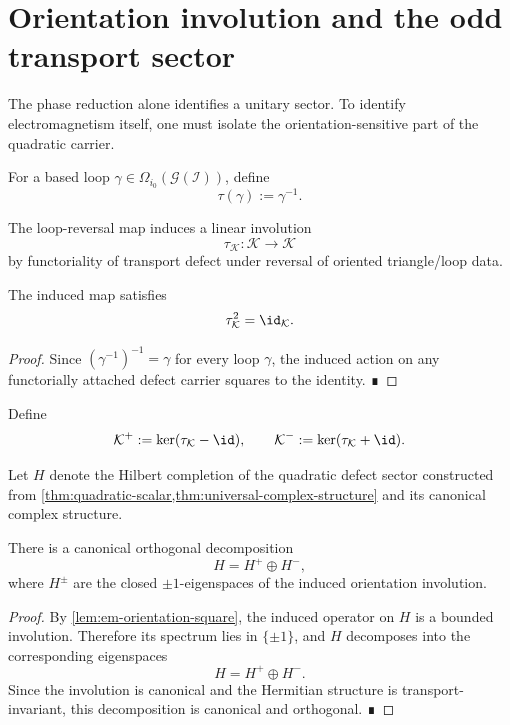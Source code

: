\section{Orientation involution and the odd transport sector}
\label{sec:em-orientation-odd}
The phase reduction alone identifies a unitary sector.
To identify electromagnetism itself, one must isolate the
orientation-sensitive part of the quadratic carrier.
\begin{definition}
	For a based loop \(\gamma\in\Omega_{i_0}(\mathcal G(\mathcal I))\), define
	\[
		\tau(\gamma):=\gamma^{-1}.
	\]
\end{definition}
\begin{definition}
	The loop-reversal map induces a linear involution
	\[
		\tau_{\mathcal K}:\mathcal K\to\mathcal K
	\]
	by functoriality of transport defect under reversal of oriented
	triangle/loop data.
\end{definition}
\begin{lemma}
	\label{lem:em-orientation-square}
	The induced map satisfies
	\[
		\tau_{\mathcal K}^2=\id_{\mathcal K}.
	\]
\end{lemma}
\begin{proof}
	Since \((\gamma^{-1})^{-1}=\gamma\) for every loop \(\gamma\), the
	induced action on any functorially attached defect carrier squares to
	the identity. ∎
\end{proof}
\begin{definition}
	Define
	\[
		\mathcal K^+ := \ker(\tau_{\mathcal K}-\id),
		\qquad
		\mathcal K^- := \ker(\tau_{\mathcal K}+\id).
	\]
\end{definition}
Let \(H\) denote the Hilbert completion of the quadratic defect sector
constructed from
\cref{thm:quadratic-scalar,thm:universal-complex-structure}
and its canonical
complex structure.
\begin{theorem}
	There is a canonical orthogonal decomposition
	\[
		H = H^+ \oplus H^-,
	\]
	where \(H^\pm\) are the closed \(\pm1\)-eigenspaces of the induced
	orientation involution.
\end{theorem}
\begin{proof}
	By \cref{lem:em-orientation-square}, the induced operator on \(H\) is a
	bounded involution.
	Therefore its spectrum lies in \(\{\pm1\}\), and \(H\) decomposes into
	the corresponding eigenspaces
	\[
		H=H^+\oplus H^-.
	\]
	Since the involution is canonical and the Hermitian structure is
	transport-invariant, this decomposition is canonical and orthogonal.
	∎
\end{proof}
